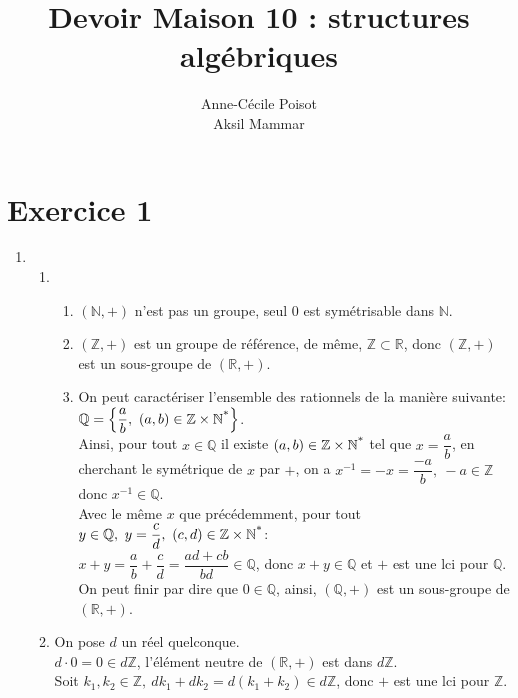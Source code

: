 \documentclass[article,11pt]{article}
\newcommand{\bgp}[1]{
    \left(#1\right)
}
\newcommand{\bgbr}[1]{
    \left\{#1\right\}
}
\begin{document}
\title{Devoir Maison 10 : structures algébriques\vspace{-.5em}}
\author{Anne-Cécile Poisot\\Aksil Mammar\vspace{-.5em}}
\maketitle

\section{Exercice 1}

\begin{enumerate}
\item\begin{enumerate}\item\begin{enumerate}[label=-]
\item$\bgp{\mathbb{N},+}$ n'est pas un groupe, seul $0$ est symétrisable dans $\mathbb{N}$.
\item$\bgp{\mathbb{Z},+}$ est un groupe de référence, de même, $\mathbb{Z}\subset\mathbb{R}$, donc $\bgp{\mathbb{Z},+}$ est un sous-groupe de $\bgp{\mathbb{R},+}$.
\item On peut caractériser l'ensemble des rationnels de la manière suivante: $\mathbb{Q}=\bgbr{\dfrac{a}{b},\ (a,b)\in\mathbb{Z}\times\mathbb{N}\strut^{*}}$.\\
Ainsi, pour tout $x\in\mathbb{Q}$ il existe $(a,b)\in\mathbb{Z}\times\mathbb{N}\strut^{*}$ tel que $x=\dfrac{a}{b}$, en cherchant le symétrique de $x$ par $+$, on a $x^{-1}=-x=\dfrac{-a}{b},\ -a\in\mathbb{Z}$ donc $x^{-1}\in\mathbb{Q}$.\\[.3em]
Avec le même $x$ que précédemment, pour tout $y\in\mathbb{Q},\ y=\dfrac{c}{d},\ (c,d)\in\mathbb{Z}\times\mathbb{N}\strut^{*}$:\\
$x+y=\dfrac{a}{b}+\dfrac{c}{d}=\dfrac{ad+cb}{bd}\in\mathbb{Q}$, donc $x+y\in\mathbb{Q}$ et $+$ est une lci pour $\mathbb{Q}$.\\[.5em]
On peut finir par dire que $0\in\mathbb{Q}$, ainsi, $\bgp{\mathbb{Q},+}$ est un sous-groupe de $\bgp{\mathbb{R},+}$.
\end{enumerate}
\item On pose $d$ un réel quelconque.\\[.3em]
$d\cdot 0=0\in d\mathbb{Z}$, l'élément neutre de $(\mathbb{R},+)$ est dans $d\mathbb{Z}$.\\[.5em]
Soit $k_{1},k_{2}\in\mathbb{Z},\ dk_{1}+dk_{2}=d(k_{1}+k_{2})\in d\mathbb{Z}$, donc $+$ est une lci pour $\mathbb{Z}$.\\[.5em]

\end{enumerate}
\end{enumerate}
\end{document}
